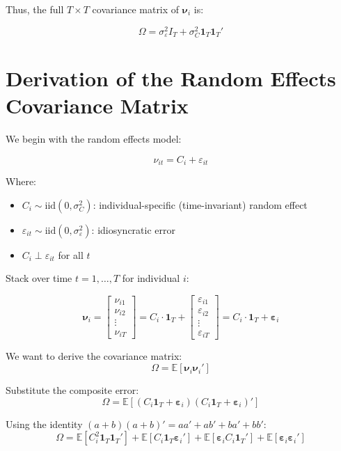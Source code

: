\documentclass[12pt, oneside]{article}
\begin{document}
Thus, the full \( T \times T \) covariance matrix of \( \bm{\nu}_i \) is:

\[
\boxed{
\Omega = \sigma_\varepsilon^2 I_T + \sigma_C^2 \bm{1}_T \bm{1}_T'
}
\]

\section*{Derivation of the Random Effects Covariance Matrix}

We begin with the random effects model:

\[
\nu_{it} = C_i + \varepsilon_{it}
\]

Where:
\begin{itemize}
    \item \( C_i \sim \text{iid}(0, \sigma_C^2) \): individual-specific (time-invariant) random effect
    \item \( \varepsilon_{it} \sim \text{iid}(0, \sigma_\varepsilon^2) \): idiosyncratic error
    \item \( C_i \perp \varepsilon_{it} \) for all \( t \)
\end{itemize}

Stack over time \( t = 1, \dots, T \) for individual \( i \):

\[
\bm{\nu}_i =
\begin{bmatrix}
\nu_{i1} \\
\nu_{i2} \\
\vdots \\
\nu_{iT}
\end{bmatrix}
= C_i \cdot \bm{1}_T + 
\begin{bmatrix}
\varepsilon_{i1} \\
\varepsilon_{i2} \\
\vdots \\
\varepsilon_{iT}
\end{bmatrix}
= C_i \cdot \bm{1}_T + \bm{\varepsilon}_i
\]

We want to derive the covariance matrix:
\[
\Omega = \mathbb{E}[\bm{\nu}_i \bm{\nu}_i']
\]

Substitute the composite error:
\[
\Omega = \mathbb{E}[(C_i \bm{1}_T + \bm{\varepsilon}_i)(C_i \bm{1}_T + \bm{\varepsilon}_i)']
\]

Using the identity \( (a + b)(a + b)' = aa' + ab' + ba' + bb' \):
\[
\Omega = \mathbb{E}[C_i^2 \bm{1}_T \bm{1}_T'] + \mathbb{E}[C_i \bm{1}_T \bm{\varepsilon}_i'] + \mathbb{E}[\bm{\varepsilon}_i C_i \bm{1}_T'] + \mathbb{E}[\bm{\varepsilon}_i \bm{\varepsilon}_i']
\]
\end{document}
